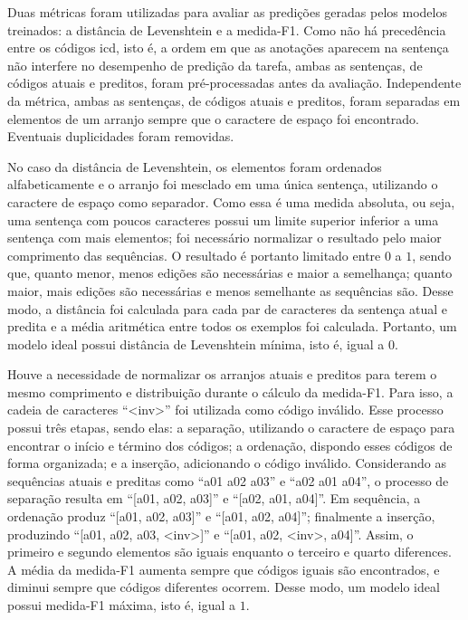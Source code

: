 Duas métricas foram utilizadas para avaliar as predições geradas pelos modelos treinados: a distância de Levenshtein e a medida-F1. Como não há precedência entre os códigos \gls{icd}, isto é, a ordem em que as anotações aparecem na sentença não interfere no desempenho de predição da tarefa, ambas as sentenças, de códigos atuais e preditos, foram pré-processadas antes da avaliação. Independente da métrica, ambas as sentenças, de códigos atuais e preditos, foram separadas em elementos de um arranjo sempre que o caractere de espaço foi encontrado. Eventuais duplicidades foram removidas.

No caso da distância de Levenshtein, os elementos foram ordenados alfabeticamente e o arranjo foi mesclado em uma única sentença, utilizando o caractere de espaço como separador. Como essa é uma medida absoluta, ou seja, uma sentença com poucos caracteres possui um limite superior inferior a uma sentença com mais elementos; foi necessário normalizar o resultado pelo maior comprimento das sequências. O resultado é portanto limitado entre $0$ a $1$, sendo que, quanto menor, menos edições são necessárias e maior a semelhança; quanto maior, mais edições são necessárias e menos semelhante as sequências são. Desse modo, a distância foi calculada para cada par de caracteres da sentença atual e predita e a média aritmética entre todos os exemplos foi calculada. Portanto, um modelo ideal possui distância de Levenshtein mínima, isto é, igual a $0$.

Houve a necessidade de normalizar os arranjos atuais e preditos para terem o mesmo comprimento e distribuição durante o cálculo da medida-F1. Para isso, a cadeia de caracteres \enquote{<inv>} foi utilizada como código inválido. Esse processo possui três etapas, sendo elas: a separação, utilizando o caractere de espaço para encontrar o início e término dos códigos; a ordenação, dispondo esses códigos de forma organizada; e a inserção, adicionando o código inválido. Considerando as sequências atuais e preditas como \enquote{a01 a02 a03} e \enquote{a02 a01 a04}, o processo de separação resulta em \enquote{[a01, a02, a03]} e \enquote{[a02, a01, a04]}. Em sequência, a ordenação produz \enquote{[a01, a02, a03]} e \enquote{[a01, a02, a04]}; finalmente a inserção, produzindo \enquote{[a01, a02, a03, <inv>]} e \enquote{[a01, a02, <inv>, a04]}. Assim, o primeiro e segundo elementos são iguais enquanto o terceiro e quarto diferences. A média da medida-F1 aumenta sempre que códigos iguais são encontrados, e diminui sempre que códigos diferentes ocorrem. Desse modo, um modelo ideal possui medida-F1 máxima, isto é, igual a $1$.

